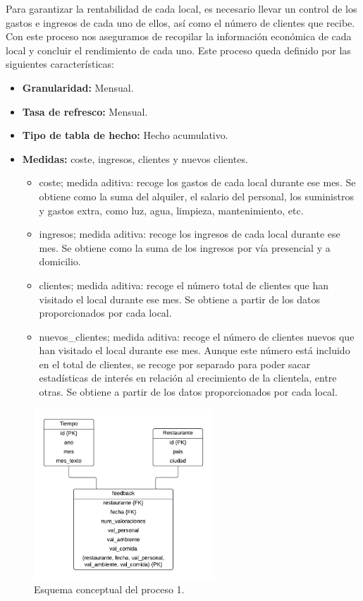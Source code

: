\documentclass[12pt]{opticajnl}
\begin{document}
Para garantizar la rentabilidad de cada local, es necesario llevar un control de los gastos e ingresos de cada uno de ellos, así como el número de clientes que recibe. Con este proceso nos aseguramos de recopilar la información económica de cada local y concluir el rendimiento de cada uno. Este proceso queda definido por las siguientes características:
\begin{itemize}
\item \textbf{Granularidad:} Mensual.
\item \textbf{Tasa de refresco:} Mensual.
\item \textbf{Tipo de tabla de hecho:} Hecho acumulativo.
\item \textbf{Medidas:} coste, ingresos, clientes y nuevos clientes.
\begin{itemize}
\item coste; medida aditiva: recoge los gastos de cada local durante ese mes. Se obtiene como la suma del alquiler, el salario del personal, los suministros y gastos extra, como luz, agua, limpieza, mantenimiento, etc. 
\item ingresos; medida aditiva: recoge los ingresos de cada local durante ese mes. Se obtiene como la suma de los ingresos por vía presencial y a domicilio.
\item clientes; medida aditiva: recoge el número total de clientes que han visitado el local durante ese mes. Se obtiene a partir de los datos proporcionados por cada local.
\item nuevos\_clientes; medida aditiva: recoge el número de clientes nuevos que han visitado el local durante ese mes. Aunque este número está incluido en el total de clientes, se recoge por separado para poder sacar estadísticas de interés en relación al crecimiento de la clientela, entre otras. Se obtiene a partir de los datos proporcionados por cada local.
\end{itemize}
\end{itemize}

\begin{figure}[h]
\centering
\includegraphics[width=0.6\textwidth]{fotos/fin.pdf}
\caption{Esquema conceptual del proceso 1.}
\label{fig:esquema_proceso1}
\end{figure}
\end{document}

